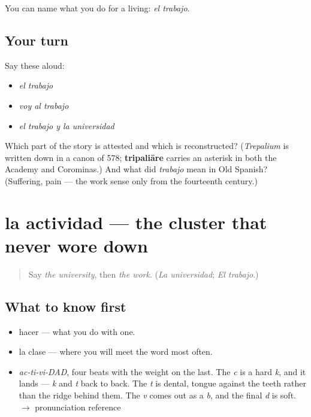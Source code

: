 \begin{grammarlens}[title={What you've built}]
You can name what you do for a living: \emph{el trabajo}.
\end{grammarlens}

\subsection*{Your turn}
Say these aloud:

\begin{itemize}
\raggedright
  \item \emph{el trabajo}
  \item \emph{voy al trabajo}
  \item \emph{el trabajo y la universidad}
\end{itemize}

\begin{tcolorbox}[breakable,colback=teal!4,colframe=teal!35!black,title={Before you move on}]
Which part of the story is attested and which is reconstructed? (\emph{Trepalium} is written down in a canon of 578; \textbf{tripaliāre} carries an asterisk in both the Academy and Corominas.) And what did \emph{trabajo} mean in Old Spanish? (Suffering, pain — the work sense only from the fourteenth century.)
\end{tcolorbox}
\section[la actividad]{la actividad — the cluster that never wore down}

\label{lesson:ES-C394-actividad}



\begin{quote}
Say \emph{the university}, then \emph{the work}. (\emph{La universidad}; \emph{El trabajo}.)
\end{quote}

\subsection*{What to know first}
\begin{itemize}
\raggedright
  \item hacer — what you do with one.
  \item la clase — where you will meet the word most often.
\end{itemize}

\begin{sounds}
\begin{itemize}
\raggedright
  \item \emph{ac-ti-vi-DAD}, four beats with the weight on the last. The \emph{c} is a hard \emph{k}, and it lands — \emph{k} and \emph{t} back to back. The \emph{t} is dental, tongue against the teeth rather than the ridge behind them. The \emph{v} comes out as a \emph{b}, and the final \emph{d} is soft. $\to$ pronunciation reference
\end{itemize}
\end{sounds}

